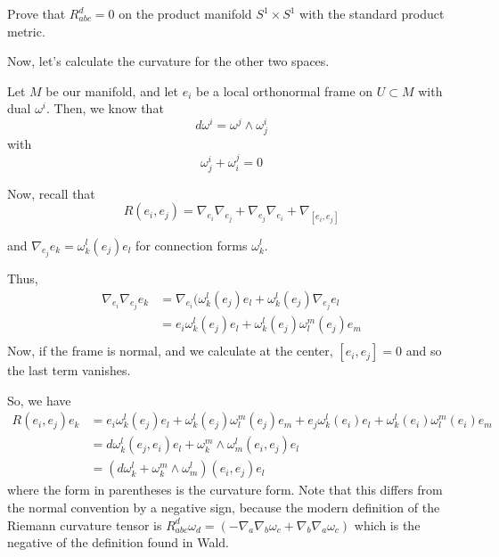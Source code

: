 \documentclass[../main.tex]{subfiles}
\begin{document}
\begin{hw}
    Prove that $R_{abc}^d = 0 $ on the product manifold $S^1\times S^1$ with the
    standard product metric.
\end{hw}

Now, let's calculate the curvature for the other two spaces.

Let $M$ be our manifold, and let $e_i$ be a local orthonormal frame on $U\subset
M$ with dual $\omega^i$. Then, we know that
\begin{equation}
    d\omega^i = \omega^j\wedge\omega_j^i
\end{equation}
with 
\begin{equation}
    \omega^i_j + \omega_i^j = 0
\end{equation}

Now, recall that
\begin{equation}
    R(e_i,e_j) = \nabla_{e_i}\nabla_{e_j} + \nabla_{e_j}\nabla_{e_i} +
\nabla_{[e_i,e_j]}
\end{equation}

and $\nabla_{e_j}e_k = \omega_k^l(e_j)e_l$ for connection forms $\omega_k^l$.

Thus,
\[
    \begin{aligned}
    \nabla_{e_i}\nabla_{e_j}e_k &= \nabla_{e_i}(\omega_k^l(e_j)e_l +
        \omega_k^l(e_j)\nabla_{e_j}e_l\\
        &=e_i \omega_k^l(e_j)e_l + \omega_k^l(e_j)\omega_l^m(e_j)e_m\\
    \end{aligned}
\]
Now, if the frame is normal, and we calculate at the center, $[e_i,e_j] = 0$ and
so the last term vanishes.

So, we have
\[
\begin{aligned}
    R(e_i,e_j)e_k &= 
        e_i \omega_k^l(e_j)e_l + \omega_k^l(e_j)\omega_l^m(e_j)e_m
        + e_j \omega_k^l(e_i)e_l + \omega_k^l(e_i)\omega_l^m(e_i)e_m\\
        &= d\omega_k^l(e_j,e_i)e_l + \omega_k^m\wedge\omega_m^l(e_i,e_j)e_l\\
        &= (d\omega_k^l + \omega_k^m\wedge\omega_m^l)(e_i,e_j)e_l
\end{aligned}
\]
where the form in parentheses is the curvature form. Note that this differs from
the normal convention by a negative sign, because the modern definition of the
Riemann curvature tensor is $R_{abc}^d\omega_d = (-\nabla_a\nabla_b\omega_c +
\nabla_b\nabla_a\omega_c)$ which is the negative of the definition found in
Wald.
\end{document}
